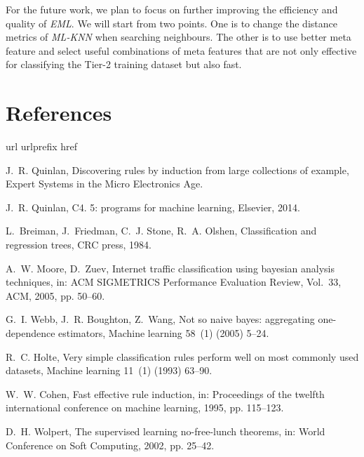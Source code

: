 \documentclass[review,3p,twocolumn,times]{elsarticle}
\begin{document}
For the future work, we plan to focus on further improving the efficiency and quality of \emph{EML}. We will start from two points. One is to change the distance metrics of \emph{ML-KNN} when searching neighbours. The other is to use better meta feature and select useful combinations of meta features that are not only effective for classifying the Tier-2 training dataset but also fast.

\section*{References}

%

\begin{thebibliography}{10}
	\expandafter\ifx\csname url\endcsname\relax
	\def\url#1{\texttt{#1}}\fi
	\expandafter\ifx\csname urlprefix\endcsname\relax\def\urlprefix{URL }\fi
	\expandafter\ifx\csname href\endcsname\relax
	\def\href#1#2{#2} \def\path#1{#1}\fi
	
	J.~R. Quinlan, Discovering rules by induction from large collections of
	example, Expert Systems in the Micro Electronics Age.
	
	J.~R. Quinlan, C4. 5: programs for machine learning, Elsevier, 2014.
	
	L.~Breiman, J.~Friedman, C.~J. Stone, R.~A. Olshen, Classification and
	regression trees, CRC press, 1984.
	
	A.~W. Moore, D.~Zuev, Internet traffic classification using bayesian analysis
	techniques, in: ACM SIGMETRICS Performance Evaluation Review, Vol.~33, ACM,
	2005, pp. 50--60.
	
	G.~I. Webb, J.~R. Boughton, Z.~Wang, Not so naive bayes: aggregating
	one-dependence estimators, Machine learning 58~(1) (2005) 5--24.
	
	R.~C. Holte, Very simple classification rules perform well on most commonly
	used datasets, Machine learning 11~(1) (1993) 63--90.
	
	W.~W. Cohen, Fast effective rule induction, in: Proceedings of the twelfth
	international conference on machine learning, 1995, pp. 115--123.
	
	D.~H. Wolpert, The supervised learning no-free-lunch theorems, in: World
	Conference on Soft Computing, 2002, pp. 25--42.
	

\end{thebibliography}
\end{document}
